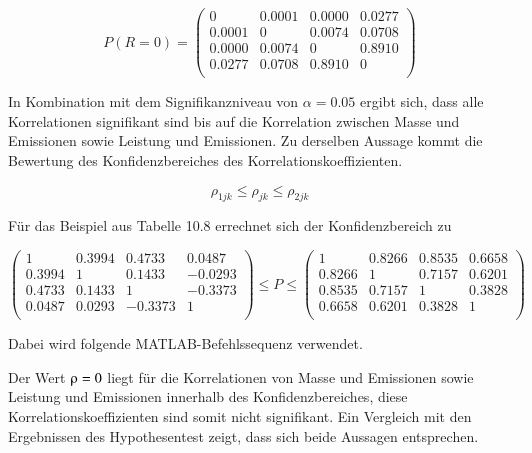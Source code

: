 \begin{equation}\label{eq:tenseventyfour}
P(R=0)=\begin{pmatrix}
0 & 0.0001 & 0.0000 & 0.0277\\
0.0001 & 0 & 0.0074 & 0.0708\\
0.0000 & 0.0074 & 0 & 0.8910\\
0.0277 & 0.0708 & 0.8910 & 0\\
\end{pmatrix}
\end{equation}

\noindent In Kombination mit dem Signifikanzniveau von $\alpha = 0.05$ ergibt sich, dass alle Korrelationen signifikant sind bis auf die Korrelation zwischen Masse und Emissionen sowie Leistung und Emissionen. Zu derselben Aussage kommt die Bewertung des Konfidenzbereiches des Korrelationskoeffizienten. 

\begin{equation}\label{eq:tenseventyfive}
\rho _{1jk} \le \rho _{jk} \le \rho _{2jk}
\end{equation}

\noindent F\"{u}r das Beispiel aus Tabelle 10.8 errechnet sich der Konfidenzbereich zu

\begin{equation}\label{eq:tenseventysix}
\begin{pmatrix}
1 & 0.3994 & 0.4733 & 0.0487\\
0.3994 & 1 & 0.1433 & -0.0293\\
0.4733 & 0.1433 & 1 & -0.3373\\
0.0487 & 0.0293 & -0.3373 & 1\\
\end{pmatrix}
\le  P \le  
\begin{pmatrix}
1 & 0.8266 & 0.8535 & 0.6658\\
0.8266 & 1 & 0.7157 & 0.6201\\
0.8535 & 0.7157 & 1 & 0.3828\\
0.6658 & 0.6201 & 0.3828 & 1\\
\end{pmatrix}
\end{equation}

\noindent Dabei wird folgende MATLAB-Befehlssequenz verwendet.



\noindent Der Wert $\rhoup = 0$ liegt f\"{u}r die Korrelationen von Masse und Emissionen sowie Leistung und Emissionen innerhalb des Konfidenzbereiches, diese Korrelationskoeffizienten sind somit nicht signifikant. Ein Vergleich mit den Ergebnissen des Hypothesentest zeigt, dass sich beide Aussagen entsprechen.\newline

